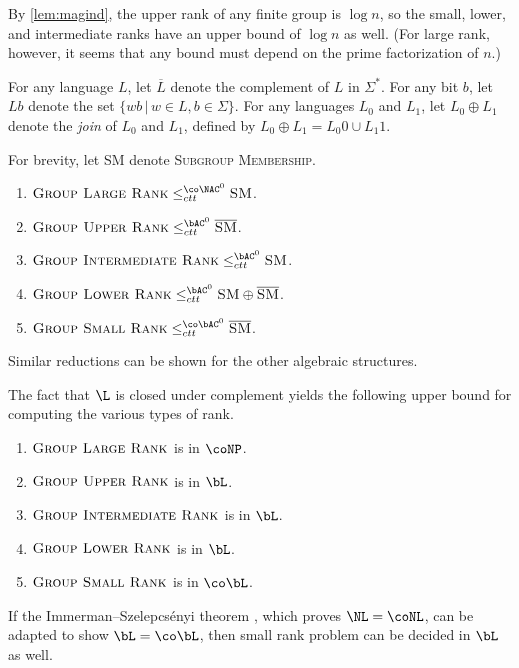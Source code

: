 By \autoref{lem:magind}, the upper rank of any finite group is $\log n$, so the small, lower, and intermediate ranks have an upper bound of $\log n$ as well.
(For large rank, however, it seems that any bound must depend on the prime factorization of $n$.)

For any language $L$, let $\overline{L}$ denote the complement of $L$ in $\Sigma^*$.
For any bit $b$, let $Lb$ denote the set $\{ wb \, | \, w \in L, b \in \Sigma\}$.
For any languages $L_0$ and $L_1$, let $L_0 \oplus L_1$ denote the \emph{join} of $L_0$ and $L_1$, defined by $L_0 \oplus L_1 = L_0 0 \cup L_1 1$.

\begin{lemma}
  For brevity, let \textsc{SM} denote \textsc{Subgroup Membership}.
  \mbox{}
  \begin{enumerate}
  \item $\textsc{Group Large Rank} \leq_{ctt}^{\co\NAC^0} \textsc{SM}$.
  \item $\textsc{Group Upper Rank} \leq_{ctt}^{\bAC^0} \overline{\textsc{SM}}$.
  \item $\textsc{Group Intermediate Rank} \leq_{ctt}^{\bAC^0} \textsc{SM}$.
  \item $\textsc{Group Lower Rank} \leq_{ctt}^{\bAC^0} \textsc{SM} \oplus \overline{\textsc{SM}}$.
  \item $\textsc{Group Small Rank} \leq_{ctt}^{\co\bAC^0} \overline{\textsc{SM}}$.
  \end{enumerate}
\end{lemma}

Similar reductions can be shown for the other algebraic structures.

The fact that $\L$ is closed under complement yields the following upper bound for computing the various types of rank.

\begin{theorem}\label{thm:otherranks}
  \mbox{}
  \begin{enumerate}
  \item $\textsc{Group Large Rank}$ is in $\coNP$.
  \item $\textsc{Group Upper Rank}$ is in $\bL$.
  \item $\textsc{Group Intermediate Rank}$ is in $\bL$.
  \item $\textsc{Group Lower Rank}$ is in $\bL$.
  \item $\textsc{Group Small Rank}$ is in $\co\bL$.
  \end{enumerate}
\end{theorem}

If the Immerman–Szelepcsényi theorem \autocite{immerman88, szelepcsenyi88}, which proves $\NL = \coNL$, can be adapted to show $\bL = \co\bL$, then small rank problem can be decided in $\bL$ as well.
